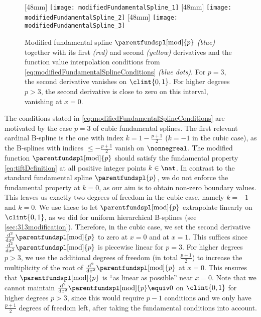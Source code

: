 \begin{figure}
  [48mm]{%
    \texttt{[image: modifiedFundamentalSpline\_1]}%
  }%
  \hfill%
  [48mm]{%
    \texttt{[image: modifiedFundamentalSpline\_2]}%
  }%
  \hfill%
  [48mm]{%
    \texttt{[image: modifiedFundamentalSpline\_3]}%
  }%
  \caption[%
    Modified fundamental spline and its derivatives%
  ]{%
    Modified fundamental spline $\parentfundspl[\modified]{p}$
    \emph{\textcolor{C0}{(blue)}} together with its
    first \emph{\textcolor{C1}{(red)}} and
    second \emph{\textcolor{C2}{(yellow)}} derivatives
    and the function value interpolation conditions from
    \cref{eq:modifiedFundamentalSplineConditions}
    \emph{\textcolor{C0}{(blue dots)}}.
    For $p = 3$, the second derivative vanishes on
    $\clint{0, 1}$.
    For higher degrees $p > 3$, the second derivative is close to zero
    on this interval, vanishing at $x = 0$.%
  }%
  \label{fig:modifiedFundamentalSpline}%
\end{figure}

The conditions stated in \eqref{eq:modifiedFundamentalSplineConditions}
are motivated by the case $p = 3$ of cubic fundamental splines.
The first relevant cardinal B-spline is the one with
index $k = 1 - \tfrac{p+1}{2}$ ($k = -1$ in the cubic case),
as the B-splines with indices $\le -\tfrac{p+1}{2}$ vanish on $\nonnegreal$.
The modified function $\parentfundspl[\modified]{p}$
should satisfy the fundamental property \eqref{eq:tiftDefinition}
at all positive integer points $k \in \nat$.
In contrast to the standard fundamental spline $\parentfundspl{p}$,
we do not enforce the fundamental property at $k = 0$,
as our aim is to obtain non-zero boundary values.
This leaves us exactly two degrees of freedom in the cubic case,
namely $k = -1$ and $k = 0$.
We use these to let $\parentfundspl[\modified]{p}$ extrapolate
linearly on $\clint{0, 1}$, as we did for uniform hierarchical
B-splines (see \cref{sec:313modification}).
Therefore, in the cubic case, we set the second derivative
$\tfrac{\diff^2}{\dx^2} \parentfundspl[\modified]{p}$ to zero
at $x = 0$ and at $x = 1$.
This suffices since
$\tfrac{\diff^2}{\dx^2} \parentfundspl[\modified]{p}$ is piecewise
linear for $p = 3$.
For higher degrees $p > 3$,
we use the additional degrees of freedom (in total $\tfrac{p+1}{2}$)
to increase the multiplicity of the root of
$\tfrac{\diff^2}{\dx^2} \parentfundspl[\modified]{p}$ at $x = 0$.
This ensures that $\parentfundspl[\modified]{p}$ is
``as linear as possible'' near $x = 0$.
Note that we cannot maintain
$\tfrac{\diff^2}{\dx^2} \parentfundspl[\modified]{p} \equiv 0$
on $\clint{0, 1}$ for higher degrees $p > 3$,
since this would require $p - 1$ conditions
and we only have $\tfrac{p+1}{2}$ degrees of freedom left,
after taking the fundamental conditions into account.



